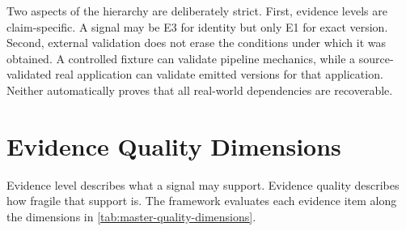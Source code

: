 Two aspects of the hierarchy are deliberately strict. First, evidence levels
are claim-specific. A signal may be E3 for identity but only E1 for exact
version. Second, external validation does not erase the conditions under which
it was obtained. A controlled fixture can validate pipeline mechanics, while a
source-validated real application can validate emitted versions for that
application. Neither automatically proves that all real-world dependencies
are recoverable.

\section{Evidence Quality Dimensions}

Evidence level describes what a signal may support. Evidence quality describes
how fragile that support is. The framework evaluates each evidence item along
the dimensions in \cref{tab:master-quality-dimensions}.

